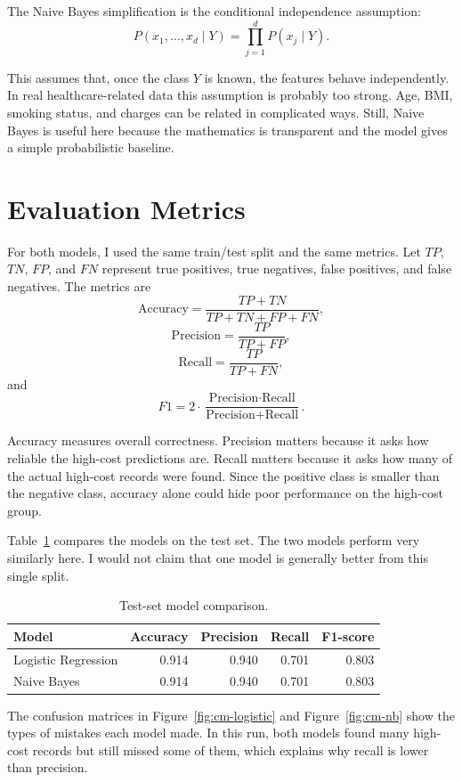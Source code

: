 \documentclass[11pt]{article}
\begin{document}
The Naive Bayes simplification is the conditional independence assumption:
\[
P(x_1,\ldots,x_d \mid Y) = \prod_{j=1}^{d} P(x_j \mid Y).
\]

This assumes that, once the class \(Y\) is known, the features behave independently. In real healthcare-related data this assumption is probably too strong. Age, BMI, smoking status, and charges can be related in complicated ways. Still, Naive Bayes is useful here because the mathematics is transparent and the model gives a simple probabilistic baseline.

\section{Evaluation Metrics}

For both models, I used the same train/test split and the same metrics. Let \(TP\), \(TN\), \(FP\), and \(FN\) represent true positives, true negatives, false positives, and false negatives. The metrics are
\[
\text{Accuracy} = \frac{TP+TN}{TP+TN+FP+FN},
\]
\[
\text{Precision} = \frac{TP}{TP+FP},
\]
\[
\text{Recall} = \frac{TP}{TP+FN},
\]
and
\[
F1 = 2 \cdot \frac{\text{Precision}\cdot\text{Recall}}{\text{Precision}+\text{Recall}}.
\]

Accuracy measures overall correctness. Precision matters because it asks how reliable the high-cost predictions are. Recall matters because it asks how many of the actual high-cost records were found. Since the positive class is smaller than the negative class, accuracy alone could hide poor performance on the high-cost group.

Table~\ref{tab:model-comparison} compares the models on the test set. The two models perform very similarly here. I would not claim that one model is generally better from this single split.

\begin{table}[H]
\centering
\begin{tabular}{lrrrr}
\toprule
Model & Accuracy & Precision & Recall & F1-score \\
\midrule
Logistic Regression & 0.914 & 0.940 & 0.701 & 0.803 \\
Naive Bayes & 0.914 & 0.940 & 0.701 & 0.803 \\
\bottomrule
\end{tabular}
\caption{Test-set model comparison.}
\label{tab:model-comparison}
\end{table}

The confusion matrices in Figure~\ref{fig:cm-logistic} and Figure~\ref{fig:cm-nb} show the types of mistakes each model made. In this run, both models found many high-cost records but still missed some of them, which explains why recall is lower than precision.
\end{document}
